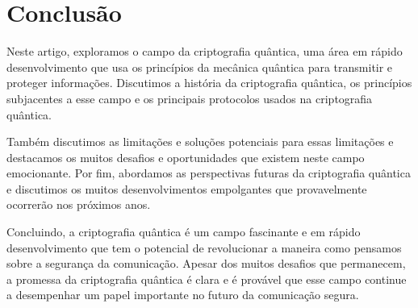 \chapter{Conclusão}

Neste artigo, exploramos o campo da criptografia quântica, uma área em rápido desenvolvimento que usa os princípios da mecânica quântica para transmitir e proteger informações. Discutimos a história da criptografia quântica, os princípios subjacentes a esse campo e os principais protocolos usados na criptografia quântica.

Também discutimos as limitações e soluções potenciais para essas limitações e destacamos os muitos desafios e oportunidades que existem neste campo emocionante. Por fim, abordamos as perspectivas futuras da criptografia quântica e discutimos os muitos desenvolvimentos empolgantes que provavelmente ocorrerão nos próximos anos.

Concluindo, a criptografia quântica é um campo fascinante e em rápido desenvolvimento que tem o potencial de revolucionar a maneira como pensamos sobre a segurança da comunicação. Apesar dos muitos desafios que permanecem, a promessa da criptografia quântica é clara e é provável que esse campo continue a desempenhar um papel importante no futuro da comunicação segura.
